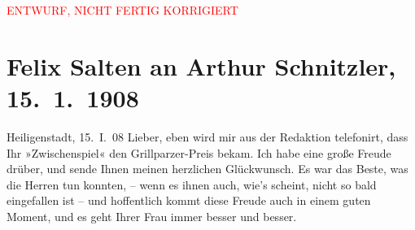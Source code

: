 
\begin{center}
            \textcolor{red}{ENTWURF, NICHT FERTIG KORRIGIERT}
                      \end{center}
            
         
         \renewcommand{\erwaehntePersonen}{Personen: Ottilie Salten, Olga Schnitzler}
         \renewcommand{\erwaehnteInstitutionen}{Institutionen: Franz-Grillparzer-Preis}
         \renewcommand{\erwaehnteOrte}{Orte: Heiligenstadt, Wien}
         \renewcommand{\erwaehnteWerke}{Werke: Zwischenspiel. Komödie in drei Akten}
               \section[Felix Salten an Arthur Schnitzler, 15. 1. 1908]{ Felix Salten an Arthur Schnitzler, 15. 1. 1908}\nopagebreak{}\rehead{ }\begin{ledgroupsized}[t]{13cm}\normalsize\beginnumbering \toendnotes[C]{\smallbreak\pagebreak[2]} 
\toendnotes[C]{\smallbreak}\pstart
           \raggedleft{}{\pb}Heiligenstadt, 15. I. 08\pend
           \pstart{}Lieber,\pend\pstart
           eben wird mir aus der Redaktion telefonirt, dass Ihr »Zwischenspiel« den Grillparzer-Preis bekam. Ich
               habe eine große Freude drüber, und sende Ihnen meinen herzlichen Glückwunsch. Es war
               das Beste, was die Herren tun konnten, – wenn es ihnen auch, wie’s scheint, nicht so
               bald eingefallen ist – und hoffentlich kommt diese Freude auch in einem guten Moment,
               und es geht Ihrer Frau immer besser und besser. \pend

\end{ledgroupsized}

